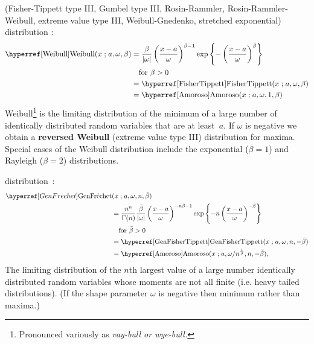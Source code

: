 (Fisher-Tippett type III, Gumbel type III, Rosin-Rammler, Rosin-Rammler-Weibull, extreme value type III, Weibull-Gnedenko, stretched exponential) distribution \cite{Weibull1951,Johnson1995}: 
\begin{align}
\label{Weibull}
\opr{Weibull}(x \given a ,\omega, \beta) 
&=	\frac{\beta}{| \omega |} \left(\frac{x-a }{\omega}\right)^{\beta-1} \exp\left\{-\left(\frac{x-a }{\omega}\right)^{\beta}\right\}  \checked
\\ \notag &\quad \text{for } \beta>0 
\\ \notag
& = \opr{FisherTippett}(x\given  a, \omega, \beta) \checked
\\ \notag
&= \opr{Amoroso}(x\given  a , \omega, 1, \beta)  \checked
\end{align}
Weibull\footnote{Pronounced variously as \sl{vay-bull} or \sl{wye-bull}.} is the limiting distribution of the minimum of a large number of  identically distributed random variables that are at least~$a$.  If $\omega$ is negative we obtain a {\bf reversed Weibull} (extreme value type III) distribution for maxima.
Special cases of the Weibull distribution include the exponential ($\beta=1$) and Rayleigh ($\beta=2$)  distributions.

 distribution~\cite{Smirnov1949,Barndorff-Nielsen1963}:
\begin{align}
\label{GenFrechet}
\GenFrechet&(x \given a , \omega, n, \bar{\beta}) 
\\
 \notag 
&=	\frac{n^n}{\Gamma(n)}  \frac{\bar{\beta}}{| \omega |} \left(\frac{x-a }{\omega}\right)^{-n\bar{\beta}-1} 
\exp\left\{-n\left(\frac{x-a }{\omega}\right)^{-\bar{\beta}}\right\} 
\checked
\\ &\quad \text{for } \bar{\beta}>0  \notag
\\ \notag
& = \opr{GenFisherTippett}(x\given a, \omega, n, -\bar{\beta})
\checked
\\ \notag
&= \opr{Amoroso}(x\given  a , {\omega}/{n^{\frac{1}{\beta} }},n,-\bar{\beta}),
\checked
\end{align}
The limiting distribution of the $n$th largest value of a large number identically distributed random variables whose moments are not all finite (i.e. heavy tailed distributions).  (If the shape parameter $\omega$ is negative then minimum rather than maxima.)


